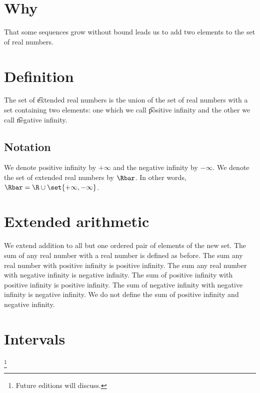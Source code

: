 

\section*{Why}

That some sequences grow without bound leads us to add two elements to the set of real numbers.

\section*{Definition}

The set of \t{extended real numbers} is the union of the set of real numbers with a set containing two elements: one which we call \t{positive infinity} and the other we call \t{negative infinity}.

\subsection*{Notation}

We denote positive infinity by $+\infty$ and the negative infinity by $-\infty$.
We denote the set of extended real numbers by $\Rbar$.
In other words, $\Rbar = \R  \cup \set{+\infty,-\infty}$.

\section*{Extended arithmetic}

We extend addition to all but one ordered pair of elements of the new set.
The sum of any real number with a real number is defined as before.
The sum any real number with positive infinity is positive infinity.
The sum any real number with negative infinity is negative infinity.
The sum of positive infinity with positive infinity is positive infinity.
The sum of negative infinity with negative infinity is negative infinity.
We do not define the sum of positive infinity and negative infinity.

\section*{Intervals}
\footnote{Future editions will discuss.}
\blankpage
